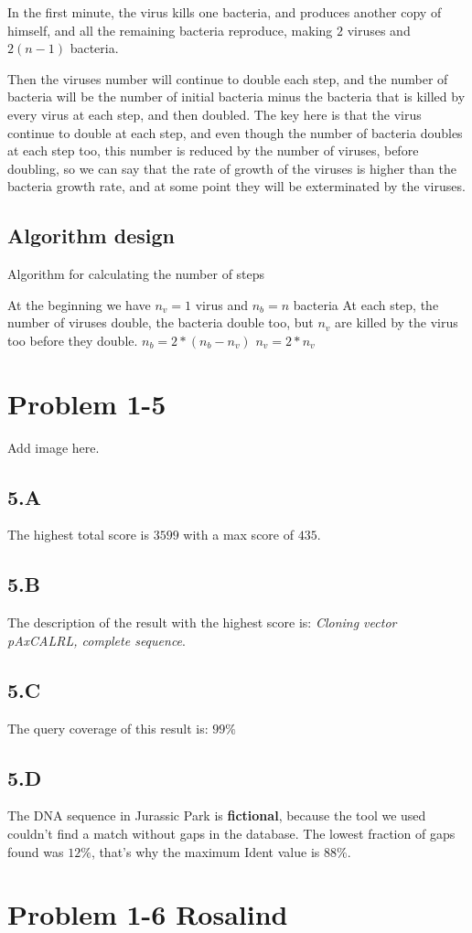 \documentclass{article}
\begin{document}
In the first minute, the virus kills one bacteria, and produces another copy of himself, and all the remaining bacteria reproduce, making $2$ viruses and $2(n-1)$ bacteria.

Then the viruses number will continue to double each step, and the number of bacteria will be the number of initial bacteria minus the bacteria that is killed by every virus at each step, and then doubled. The key here is that the virus continue to double at each step, and even though the number of bacteria doubles at each step too, this number is reduced by the number of viruses, before doubling, so we can say that the rate of growth of the viruses is higher than the bacteria growth rate, and at some point they will be exterminated by the viruses.

\subsection*{Algorithm design}

\begin{algorithm}[H]
\caption{Algorithm for calculating the number of steps}
\begin{algorithmic}[1]
\State At the beginning we have $n_v = 1$ virus and $n_b = n$ bacteria
\State At each step, the number of viruses double, the bacteria double too, but $n_v$ are killed by the virus too before they double.
 \State $n_b = 2*(n_b-n_v)$
 \State $n_v = 2*n_v$
\EndWhile
\end{algorithmic}
\end{algorithm}

\section*{Problem 1-5}

Add image here.

\subsection*{5.A}
The highest total score is $3599$ with a max score of $435$.

\subsection*{5.B}
The description of the result with the highest score is: \textit{Cloning vector pAxCALRL, complete sequence}.

\subsection*{5.C}
The query coverage of this result is: $99\%$

\subsection*{5.D}
The DNA sequence in Jurassic Park is \textbf{fictional}, because the tool we used couldn't find a match without gaps in the database. The lowest fraction of gaps found was $12\%$, that's why the maximum Ident value is $88\%$.

\section*{Problem 1-6 Rosalind}
\end{document}
